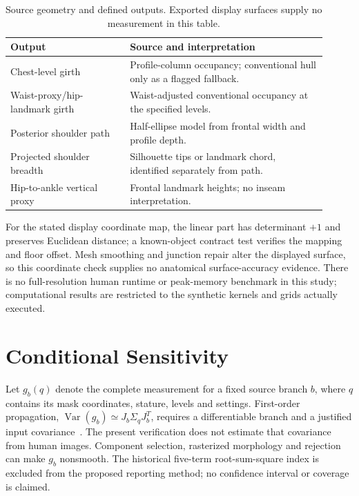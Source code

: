 \documentclass[11pt,a4paper]{article}
\begin{document}
\begin{table}[htbp]
\centering
\caption{Source geometry and defined outputs. Exported display surfaces supply no measurement in this table.}
\label{tab:branches}
\small
\begin{tabular}{p{0.34\linewidth}p{0.57\linewidth}}
\toprule
Output & Source and interpretation\\
\midrule
Chest-level girth & Profile-column occupancy; conventional hull only as a flagged fallback.\\
Waist-proxy/hip-landmark girth & Waist-adjusted conventional occupancy at the specified levels.\\
Posterior shoulder path & Half-ellipse model from frontal width and profile depth.\\
Projected shoulder breadth & Silhouette tips or landmark chord, identified separately from path.\\
Hip-to-ankle vertical proxy & Frontal landmark heights; no inseam interpretation.\\
\bottomrule
\end{tabular}
\end{table}

For the stated display coordinate map, the linear part has determinant $+1$ and preserves Euclidean distance; a known-object contract test verifies the mapping and floor offset. Mesh smoothing and junction repair alter the displayed surface, so this coordinate check supplies no anatomical surface-accuracy evidence. There is no full-resolution human runtime or peak-memory benchmark in this study; computational results are restricted to the synthetic kernels and grids actually executed.

\section{Conditional Sensitivity}
Let $g_b(q)$ denote the complete measurement for a fixed source branch $b$, where $q$ contains its mask coordinates, stature, levels and settings. First-order propagation, $\operatorname{Var}(g_b)\simeq J_b\Sigma_qJ_b^T$, requires a differentiable branch and a justified input covariance~\cite{jcgm2008}. The present verification does not estimate that covariance from human images. Component selection, rasterized morphology and rejection can make $g_b$ nonsmooth. The historical five-term root-sum-square index is excluded from the proposed reporting method; no confidence interval or coverage is claimed.
\end{document}
